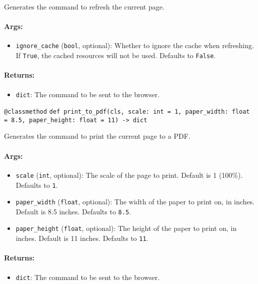 \documentclass{article}
\begin{document}
\noindent Generates the command to refresh the current page.

\paragraph{Args:}
\begin{itemize}
    \item \texttt{ignore\_cache} (\texttt{bool}, optional): Whether to ignore the cache when refreshing. If \texttt{True}, the cached resources will not be used. Defaults to \texttt{False}.
\end{itemize}

\paragraph{Returns:}
\begin{itemize}
    \item \texttt{dict}: The command to be sent to the browser.
\end{itemize}

\noindent\texttt{@classmethod}
\noindent\texttt{def print\_to\_pdf(cls, scale: int = 1, paper\_width: float = 8.5, paper\_height: float = 11) -> dict}

\noindent Generates the command to print the current page to a PDF.

\paragraph{Args:}
\begin{itemize}
    \item \texttt{scale} (\texttt{int}, optional): The scale of the page to print. Default is 1 (100\%). Defaults to \texttt{1}.
    \item \texttt{paper\_width} (\texttt{float}, optional): The width of the paper to print on, in inches. Default is 8.5 inches. Defaults to \texttt{8.5}.
    \item \texttt{paper\_height} (\texttt{float}, optional): The height of the paper to print on, in inches. Default is 11 inches. Defaults to \texttt{11}.
\end{itemize}

\paragraph{Returns:}
\begin{itemize}
    \item \texttt{dict}: The command to be sent to the browser.
\end{itemize}
\end{document}
